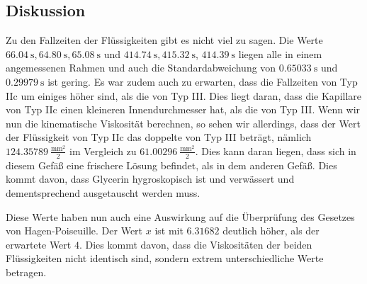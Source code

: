         \subsection{Diskussion}

            Zu den Fallzeiten der Flüssigkeiten gibt es nicht viel zu sagen. Die Werte $66.04\ \mathrm{s}, 64.80\ \mathrm{s}, 65.08\ \mathrm{s}$ und $414.74\ \mathrm{s}, 415.32\ \mathrm{s}$, $414.39\ \mathrm{s}$ liegen alle in einem angemessenen Rahmen und auch die Standardabweichung von $0.65033\ \mathrm{s}$ und $0.29979\ \mathrm{s}$ ist gering. Es war zudem auch zu erwarten, dass die Fallzeiten von Typ IIc um einiges höher sind, als die von Typ III. Dies liegt daran, dass die Kapillare von Typ IIc einen kleineren Innendurchmesser hat, als die von Typ III. Wenn wir nun die kinematische Viskosität berechnen, so sehen wir allerdings, dass der Wert der Flüssigkeit von Typ IIc das doppelte von Typ III beträgt, nämlich $124.35789\ \mathrm{\frac{mm^2}{2}}$ im Vergleich zu $61.00296\ \mathrm{\frac{mm^2}{2}}$. Dies kann daran liegen, dass sich in diesem Gefäß eine frischere Lösung befindet, als in dem anderen Gefäß. Dies kommt davon, dass Glycerin hygroskopisch ist und verwässert und dementsprechend ausgetauscht werden muss.

            Diese Werte haben nun auch eine Auswirkung auf die Überprüfung des Gesetzes von Hagen-Poiseuille. Der Wert $x$ ist mit $6.31682$ deutlich höher, als der erwartete Wert $4$. Dies kommt davon, dass die Viskositäten der beiden Flüssigkeiten nicht identisch sind, sondern extrem unterschiedliche Werte betragen.